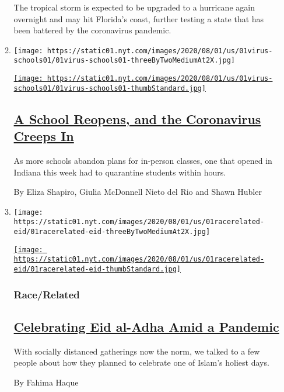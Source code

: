 \begin{enumerate}
\begin{enumerate}
    The tropical storm is expected to be upgraded to a hurricane again
    overnight and may hit Florida's coast, further testing a state that
    has been battered by the coronavirus pandemic.
  \item
    \texttt{[image: https://static01.nyt.com/images/2020/08/01/us/01virus-schools01/01virus-schools01-threeByTwoMediumAt2X.jpg]}

    \href{/2020/08/01/us/schools-reopening-indiana-coronavirus.html}{\texttt{[image: https://static01.nyt.com/images/2020/08/01/us/01virus-schools01/01virus-schools01-thumbStandard.jpg]}}

    \hypertarget{a-school-reopens-and-the-coronavirus-creeps-in}{%
    \subsection{\texorpdfstring{\href{/2020/08/01/us/schools-reopening-indiana-coronavirus.html}{A
    School Reopens, and the Coronavirus Creeps
    In}}{A School Reopens, and the Coronavirus Creeps In}}\label{a-school-reopens-and-the-coronavirus-creeps-in}}

    As more schools abandon plans for in-person classes, one that opened
    in Indiana this week had to quarantine students within hours.

    By Eliza Shapiro, Giulia McDonnell Nieto del Rio and Shawn Hubler
  \item
    \texttt{[image: https://static01.nyt.com/images/2020/08/01/us/01racerelated-eid/01racerelated-eid-threeByTwoMediumAt2X.jpg]}

    \href{/2020/08/01/us/eid-al-adha-coronavirus.html}{\texttt{[image: https://static01.nyt.com/images/2020/08/01/us/01racerelated-eid/01racerelated-eid-thumbStandard.jpg]}}

    \hypertarget{racerelated}{%
    \subsubsection{Race/Related}\label{racerelated}}

    \hypertarget{celebrating-eid-al-adha-amid-a-pandemic}{%
    \subsection{\texorpdfstring{\href{/2020/08/01/us/eid-al-adha-coronavirus.html}{Celebrating
    Eid al-Adha Amid a
    Pandemic}}{Celebrating Eid al-Adha Amid a Pandemic}}\label{celebrating-eid-al-adha-amid-a-pandemic}}

    With socially distanced gatherings now the norm, we talked to a few
    people about how they planned to celebrate one of Islam's holiest
    days.

    By Fahima Haque
  \end{enumerate}
\end{enumerate}

